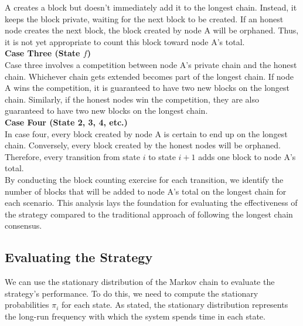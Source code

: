 A creates a block but doesn't immediately add it to the longest chain. Instead, it keeps the block private, waiting for the next block to be created. If an honest node creates the next block, the block created by node A will be orphaned. Thus, it is not yet appropriate to count this block toward node A's total.\\

\noindent
\textbf{Case Three (State $f$)}\\
Case three involves a competition between node A's private chain and the honest chain. Whichever chain gets extended becomes part of the longest chain. If node A wins the competition, it is guaranteed to have two new blocks on the longest chain. Similarly, if the honest nodes win the competition, they are also guaranteed to have two new blocks on the longest chain.\\

\noindent
\textbf{Case Four (State 2, 3, 4, etc.)}\\
In case four, every block created by node A is certain to end up on the longest chain. Conversely, every block created by the honest nodes will be orphaned. Therefore, every transition from state $i$ to state $i+1$ adds one block to node A's total.\\

By conducting the block counting exercise for each transition, we identify the number of blocks that will be added to node A's total on the longest chain for each scenario. This analysis lays the foundation for evaluating the effectiveness of the strategy compared to the traditional approach of following the longest chain consensus.

\subsection{Evaluating the Strategy}
We can use the stationary distribution of the Markov chain to evaluate the strategy's performance. To do this, we need to compute the stationary probabilities $\pi_i$ for each state. As stated, the stationary distribution represents the long-run frequency with which the system spends time in each state.

